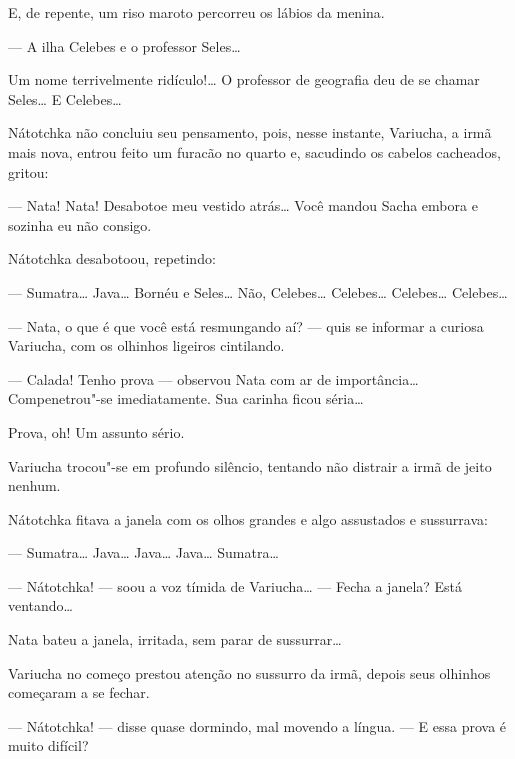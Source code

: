 E, de repente, um riso maroto percorreu os lábios da menina.

--- A ilha Celebes e o professor Seles\ldots{}

Um nome terrivelmente ridículo!\ldots{} O professor de geografia deu de se
chamar Seles\ldots{} E Celebes\ldots{}

Nátotchka não concluiu seu pensamento, pois, nesse instante, Variucha, a
irmã mais nova, entrou feito um furacão no quarto e, sacudindo os
cabelos cacheados, gritou:

--- Nata! Nata! Desabotoe meu vestido atrás\ldots{} Você mandou Sacha embora
e sozinha eu não consigo.

Nátotchka desabotoou, repetindo:

--- Sumatra\ldots{} Java\ldots{} Bornéu e Seles\ldots{} Não, Celebes\ldots{} Celebes\ldots{}
Celebes\ldots{} Celebes\ldots{}

--- Nata, o que é que você está resmungando aí? --- quis se informar a
curiosa Variucha, com os olhinhos ligeiros cintilando.

--- Calada! Tenho prova --- observou Nata com ar de importância\ldots{}
Compenetrou"-se imediatamente. Sua carinha ficou séria\ldots{}

Prova, oh! Um assunto sério.

Variucha trocou"-se em profundo silêncio, tentando não distrair a irmã de
jeito nenhum.

Nátotchka fitava a janela com os olhos grandes e algo assustados e
sussurrava:

--- Sumatra\ldots{} Java\ldots{} Java\ldots{} Java\ldots{} Sumatra\ldots{}

--- Nátotchka! --- soou a voz tímida de Variucha\ldots{} --- Fecha a janela?
Está ventando\ldots{}

Nata bateu a janela, irritada, sem parar de sussurrar\ldots{}

Variucha no começo prestou atenção no sussurro da irmã, depois seus
olhinhos começaram a se fechar.

--- Nátotchka! --- disse quase dormindo, mal movendo a língua. --- E
essa prova é muito difícil?

